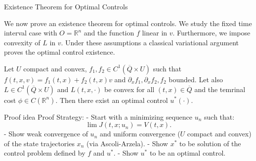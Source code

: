 \documentclass[10pt, compress]{beamer}
\newcommand{\R}{\mathbb{R}}
\begin{document}
\begin{frame}{Existence Theorem for Optimal Controls}

    We now prove an existence theorem for optimal controls.
We study the fixed time interval case with $O=\R^n$ and the function $f$ linear in $v$.
Furthermore, we impose convexity of $L$ in $v$. Under these assumptions a classical variational
argument proves the optimal control existence.
\begin{theorem}
    Let $U$ compact and convex, $f_1,f_2\in C^1(\overline{Q}\times U)$ such that $f(t,x,v)=f_1(t,x)+f_2(t,x)v$ and $\partial_xf_{1},\partial_xf_2,f_2$ bounded.
    Let also $L\in C^1(\overline{Q}\times U)$ and $L(t,x,\cdot)$ be convex for all $(t,x)\in\overline{Q}$ and the temrinal cost $\phi\in C(\R^n)$. Then there exist an optimal control $u^{\ast}(\cdot)$.
\end{theorem}
\end{frame}

\begin{frame}{Proof idea}
        Proof Strategy:
               \newline
               -  Start with a minimizing sequence \(u_n\) such that:
            \[\lim J(t,x;u_n) = V(t,x).\]
               \newline
               -  Show weak convergence of \(u_n\) and uniform convergence ($U$ compact and convex) of the state trajectories \(x_n\) (via Ascoli-Arzela).
               \newline
               -  Show $x^{\ast}$ to be solution of the control problem defined by $f$ and $u^{\ast}$.
               \newline
               -  Show \(u^{\ast}\) to be an optimal control.
\end{frame}

\end{document}
